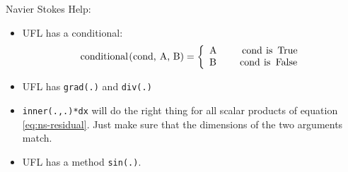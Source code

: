 \documentclass[12pt,a4paper]{article}
\begin{document}
\begin{Exercise}{Navier Stokes}
  Help:
  \begin{itemize}
  \item UFL has a conditional:
    \begin{displaymath}
      \text{\lstinline{conditional(cond, A, B)}} = \left\{
        \begin{array}{lr}
          \text{\lstinline{A}}\ \ \ \ & \text{\lstinline{cond is True}} \\
          \text{\lstinline{B}} & \text{\lstinline{cond is False}}
        \end{array}
      \right.
    \end{displaymath}
  \item UFL has \lstinline{grad(.)} and \lstinline{div(.)}
  \item \lstinline{inner(.,.)*dx} will do the right thing for all scalar
    products of equation \eqref{eq:ns-residual}. Just make sure that the
    dimensions of the two arguments match.
  \item UFL has a method \lstinline{sin(.)}.
  \end{itemize}
\end{Exercise}
\end{document}
